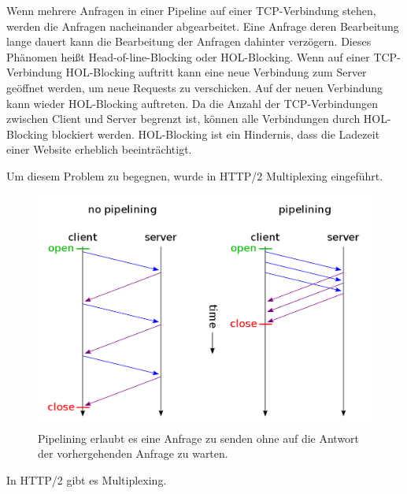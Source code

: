 \documentclass{llncs}
\begin{document}
Wenn mehrere Anfragen in einer Pipeline auf einer TCP-Verbindung stehen, werden die Anfragen nacheinander abgearbeitet. Eine Anfrage deren Bearbeitung lange dauert kann die Bearbeitung der Anfragen dahinter verzögern. Dieses Phänomen heißt Head-of-line-Blocking oder HOL-Blocking. Wenn auf einer TCP-Verbindung HOL-Blocking auftritt kann eine neue Verbindung zum Server geöffnet werden, um neue Requests zu verschicken. Auf der neuen Verbindung kann wieder HOL-Blocking auftreten. Da die Anzahl der TCP-Verbindungen zwischen Client und Server begrenzt ist, können alle Verbindungen durch HOL-Blocking blockiert werden. HOL-Blocking ist ein Hindernis, dass die Ladezeit einer Website erheblich beeinträchtigt.

Um diesem Problem zu begegnen, wurde in HTTP/2 Multiplexing eingeführt.
\begin{figure}
\includegraphics[width=\columnwidth]{1200px-HTTP_pipelining2}
\caption{Pipelining erlaubt es eine Anfrage zu senden ohne auf die Antwort der vorhergehenden Anfrage zu warten.}
\end{figure}


In HTTP/2 gibt es Multiplexing.\cite{Belshe2015}
\end{document}
